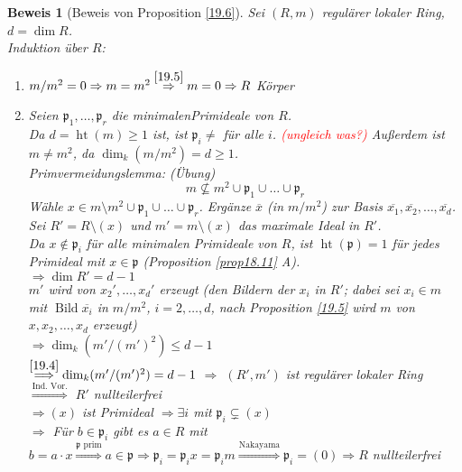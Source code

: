 \documentclass[a4paper,12pt]{report}
\theoremstyle{break}
\theoremstyle{nonumberbreak}
\newtheorem{Bew}{Beweis}
\theoremstyle{nonumberplain}
\DeclareMathOperator{\Bild}{Bild}
\DeclareMathOperator{\Ht}{ht}
\newcommand{\frakp}{\mathfrak{p}}
\begin{document}
\begin{Bew}[Beweis von Proposition \ref{19.6}]
Sei $(R,m)$ regul\"arer lokaler Ring, $d=\dim R$.\\
\emph{Induktion \"uber $R$:}\begin{enumerate}[\underline{$d=0$}:]
\item[\underline{$d=0$}:]
	$m/m^2=0\Rightarrow m=m^2 \overset{\ref{19.5}}{\Rightarrow} m=0 \Rightarrow R$ K\"orper
\item[\underline{$d\ge1$}:]
	Seien $\frakp_1,\ldots ,\frakp_r$ die minimalenPrimideale von $R$.\\
	Da $d=\Ht(m)\ge1$ ist, ist $\frakp_i\ne$ f\"ur alle $i$. \textcolor{red}{(ungleich was?)} Au\ss erdem ist $m\ne m^2$, da $\dim_k(m/m^2)=d\ge1$.\\
	\emph{Primvermeidungslemma:} (\"Ubung)
		\[m\nsubseteq m^2 \cup \frakp_1\cup\ldots \cup \frakp_r\]
	W\"ahle $x\in m\setminus m^2 \cup \frakp_1 \cup \ldots \cup \frakp_r$. Erg\"anze $\overline{x}$ (in $m/m^2$) zur Basis $\overline{x_1}, \overline{x_2},\ldots ,\overline{x_d}$.\\
	Sei $R'=R\setminus(x)$ und $m'=m\setminus(x)$ das maximale Ideal in $R'$.\\
	Da $x\notin \frakp_i$ f\"ur alle minimalen Primideale von $R$, ist $\Ht(\frakp)=1$ f\"ur jedes Primideal mit $x\in \frakp$ (Proposition \ref{prop18.11} A).\\
	$\Rightarrow \dim R' = d-1$\\
	$m'$ wird von $x_2',\ldots ,x_d'$ erzeugt (den Bildern der $x_i$ in $R'$; dabei sei $x_i\in m$ mit $\Bild \overline{x_i}$ in $m/m^2$, $i=2,\ldots ,d$, nach Proposition \ref{19.5} wird $m$ von $x,x_2,\ldots ,x_d$ erzeugt)\\
	$\Rightarrow \dim_k(m'/(m')^2)\le d-1$\\
	$\overset{\ref{19.4}}{\Longrightarrow} \dim_k(m'/(m')^2)=d-1$ $\Rightarrow$ $(R',m')$ ist regul\"arer lokaler Ring\\
	$\overset{\text{Ind. Vor.}}{\Longrightarrow}$ $R'$ nullteilerfrei\\
	$\Rightarrow (x)$ ist Primideal $\Rightarrow \exists i$ mit $\frakp_i\subsetneq(x)$\\
	$\Rightarrow $ F\"ur $b\in \frakp_i$ gibt es $a\in R$ mit $b=a\cdot x \overset{\frakp \text{ prim}}{\Longrightarrow} a\in \frakp \Rightarrow \frakp_i = \frakp_ix= \frakp_im \overset{\text{Nakayama}}{\Longrightarrow} \frakp_i=(0) \Rightarrow R$ nullteilerfrei
\end{enumerate}
\end{Bew}
\end{document}
